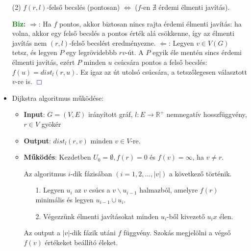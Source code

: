 \documentclass[../../szobeli.tex]{subfiles}
\begin{document}
\begin{itemize}
        (2) $f (r,l)$-felső becslés (pontosan) $\Longleftrightarrow$ ($f$-en $\nexists$ érdemi élmenti javítás).

        \textcolor{green}{\textbf{Biz:}}  $\Rightarrow$: Ha $f$ pontos, akkor biztosan nincs rajta érdemi élmenti javítás: ha volna, akkor egy felső becslés a pontos érték alá csökkenne, így az élmenti javítás nem  $(r,l)$-felső becslést eredményezne. $\Leftarrow$: Legyen $v \in V(G)$ tetsz, és legyen $P$ egy legrövidebbb $rv$-út. A $P$ egyik éle mentén sincs érdemi élmenti javítás, ezért $P$ minden $u$ csúcsára pontos a felső becslés: $f(u) = dist_l(r,u)$. Ez igaz az út utolsó csúcsára, a tetszőlegesen választott $v$-re is.  \textcolor{blue}{$\Box$}
        
        \item {Dijkstra algoritmus működése:} \begin{itemize}
            \item \textbf{Input}: $G=(V,E)$ irányított gráf, $l:E\rightarrow \mathbb{R}^+$ nemnegatív hosszfüggvény, $r \in V$ gyökér
            \item \textbf{Output}: $dist_l(r,v)$ minden $v \in V$-re.
            \item \textbf{Működés}: Kezdetben $U_0 = \emptyset, f(r) = 0$ és $f(v) = \infty$, ha $v \neq r$. 
            
            Az algoritmus $i$-dik fázisában $(i=1,2,..., |v|)$ a következő történik. \begin{itemize}
                \item[1.] Legyen $u_i$ az $v$ csúcs a $v\backslash u_{i-1}$ halmazból, amelyre $f(r)$ minimális és legyen $u_{i-1} \cup {u_i}$.
                \item[2.] Végezzünk élmenti javításokat minden $u_i$-ből kivezető $u_ix$ élen.
            \end{itemize}
            
            Az output a $|v|$-dik fázik utáni $f$ függvény. Szokás  megjelölni a végső $f(v)$ értékeket beállító éleket. 
            

\end{itemize}
\end{itemize}
\end{document}
